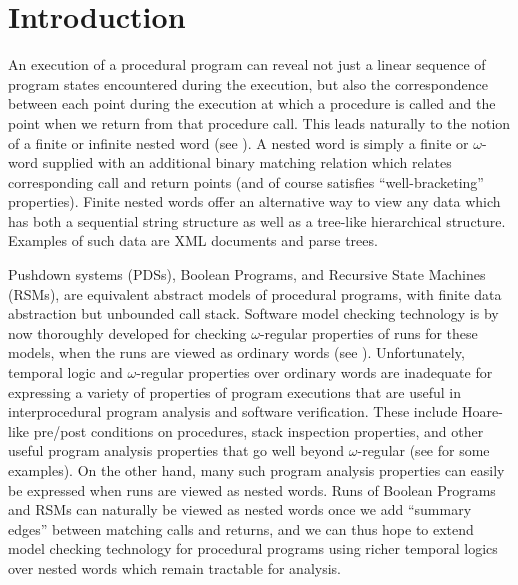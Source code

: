\documentclass{LMCS}
\theoremstyle{plain}
\theoremstyle{definition}
\newcounter{example}
\begin{document}
\maketitle
\vfill\eject

\section{Introduction} 
\noindent An execution of a procedural program can reveal
not just a linear sequence of program states encountered during the
execution, but also the correspondence between each point during the
execution at which a procedure is called and the point when we return
from that procedure call.  This leads naturally to the notion of a
finite or infinite nested word (see \cite{nested,VPL,AEM04}).  A
nested word is simply a finite or $\omega$-word supplied with an
additional binary matching relation which relates corresponding call
and return points (and of course satisfies ``well-bracketing''
properties).  Finite nested words offer an alternative way to view any
data which has both a sequential string structure as well as a
tree-like hierarchical structure.  Examples of such data are XML
documents and parse trees.

Pushdown systems (PDSs), Boolean Programs, and Recursive State
Machines (RSMs), are equivalent abstract models of procedural
programs, with finite data abstraction but unbounded call stack.
Software model checking technology is by now thoroughly developed for
checking $\omega$-regular properties of runs for these models, when
the runs are viewed as ordinary words (see 
\cite{BallRajamani,moped,RSM}).  Unfortunately, temporal logic and
$\omega$-regular properties over ordinary words are inadequate for
expressing a variety of properties of program executions that are
useful in interprocedural program analysis and software verification.
These include Hoare-like pre/post conditions on procedures, stack
inspection properties, and other useful program analysis properties
that go well beyond $\omega$-regular (see \cite{AEM04} for some
examples).  On the other hand, many such program analysis properties
can easily be expressed when runs are viewed as nested words.  
Runs of Boolean Programs and RSMs can naturally be viewed as
nested words once we add ``summary edges'' between matching calls and
returns, and we can thus hope to extend model checking technology for
procedural programs using richer temporal logics over nested words
which remain tractable for analysis.
\end{document}

